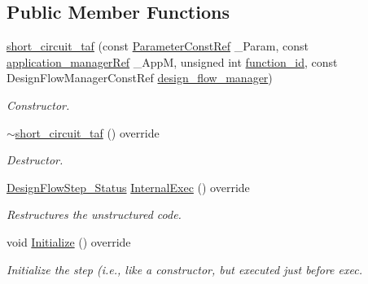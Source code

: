 \subsection*{Public Member Functions}
\begin{DoxyCompactItemize}
\item 
\hyperlink{classshort__circuit__taf_a45779c36d6745e44e9463694cf4536cc}{short\+\_\+circuit\+\_\+taf} (const \hyperlink{Parameter_8hpp_a37841774a6fcb479b597fdf8955eb4ea}{Parameter\+Const\+Ref} \+\_\+\+Param, const \hyperlink{application__manager_8hpp_a04ccad4e5ee401e8934306672082c180}{application\+\_\+manager\+Ref} \+\_\+\+AppM, unsigned int \hyperlink{classFunctionFrontendFlowStep_a58ef2383ad1a212a8d3f396625a4b616}{function\+\_\+id}, const Design\+Flow\+Manager\+Const\+Ref \hyperlink{classDesignFlowStep_ab770677ddf087613add30024e16a5554}{design\+\_\+flow\+\_\+manager})
\begin{DoxyCompactList}\small\item\em Constructor. \end{DoxyCompactList}\item 
\hyperlink{classshort__circuit__taf_a7c67b889806ffa462904b9bdfcebaba0}{$\sim$short\+\_\+circuit\+\_\+taf} () override
\begin{DoxyCompactList}\small\item\em Destructor. \end{DoxyCompactList}\item 
\hyperlink{design__flow__step_8hpp_afb1f0d73069c26076b8d31dbc8ebecdf}{Design\+Flow\+Step\+\_\+\+Status} \hyperlink{classshort__circuit__taf_a859bc9ef4199b52ef26a8bd39fcb699b}{Internal\+Exec} () override
\begin{DoxyCompactList}\small\item\em Restructures the unstructured code. \end{DoxyCompactList}\item 
void \hyperlink{classshort__circuit__taf_ab6bd4b50e2ab5bd53ab964156829ce6b}{Initialize} () override
\begin{DoxyCompactList}\small\item\em Initialize the step (i.\+e., like a constructor, but executed just before exec. \end{DoxyCompactList}\end{DoxyCompactItemize}
